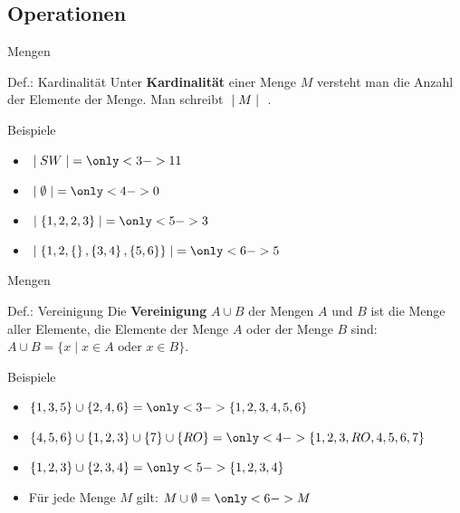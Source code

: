 \subsection{Operationen}
	\begin{frame}{Mengen}
		\begin{block}{Def.: Kardinalität}
			Unter \textbf{Kardinalität} einer Menge $M$ versteht man die Anzahl der Elemente der Menge. Man schreibt $\; \mid M \mid \;$ .
		\end{block}
		\pause
		\begin{exampleblock}{Beispiele}
			\begin{itemize}
				\item $\setsize{SW} = \only<3->{11}$
				\item $\setsize{\emptyset} = \only<4->{0}$
				\item $\setsize{\{1,2,2,3\}} = \only<5->{3}$
				\item $\setsize{\set{1, 2, \set{}, \set{3,4}, \set{5, 6}}} = \only<6->{5}$
			\end{itemize}
		\end{exampleblock}
	\end{frame}

	\begin{frame}{Mengen}
		\begin{block}{Def.: Vereinigung}
			Die \textbf{Vereinigung} $A \cup B$ der Mengen $A$ und $B$ ist die Menge aller Elemente, die Elemente der Menge $A$ oder der Menge $B$ sind: $A \cup B = \{x \mid x \in A \text{ oder } x \in B\}$.
		\end{block}
		\pause
		\begin{exampleblock}{Beispiele}
			\begin{itemize}
				\item $\{1,3,5\}\cup\{2,4,6\} = \only<3->{\{1,2,3,4,5,6\}}$
				\item $\{4,5,6\}\cup\{1,2,3\}\cup\{7\}\cup\{RO\} = \only<4->{\{1,2,3,RO,4,5,6,7\}}$
				\item $\{1,2,3\}\cup\{2,3,4\} = \only<5->{\{1,2,3,4\}}$
				\item Für jede Menge $M$ gilt: $M \cup \emptyset = \only<6->{M}$
			\end{itemize}
		\end{exampleblock}
	\end{frame}

